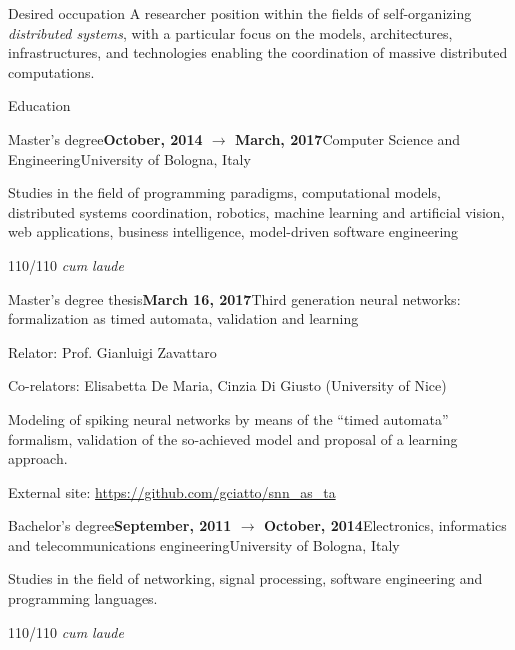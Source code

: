 \documentclass{resume} %
\begin{document}
\begin{rSection}{Desired occupation}
A researcher position within the fields of self-organizing \emph{distributed systems}, with a particular focus on the models, architectures, infrastructures, and technologies enabling the coordination of massive distributed computations.
\end{rSection}


\begin{rSection}{Education}
\begin{rSubsection}{Master's degree}{\textbf{October, 2014 $\rightarrow$ March, 2017}}{Computer Science and Engineering}{University of Bologna, Italy}
\item Studies in the field of programming paradigms, computational models, distributed systems coordination, robotics, machine learning and artificial vision, web applications, business intelligence, model-driven software engineering

\item 110/110 \emph{cum laude}
\end{rSubsection}
\begin{rSubsection}{Master's degree thesis}{\textbf{March 16, 2017}}{Third generation neural networks: formalization as timed automata, validation and learning}{\begin{flushright}
			Relator: Prof. Gianluigi Zavattaro
		\end{flushright}}
	\item Co-relators: Elisabetta De Maria, Cinzia Di Giusto (University of Nice)
	\item Modeling of spiking neural networks by means of the ``timed automata'' formalism, validation of the so-achieved model and proposal of a learning approach.
	
	\item External site: \url{https://github.com/gciatto/snn_as_ta}
\end{rSubsection}
\begin{rSubsection}{Bachelor's degree}{\textbf{September, 2011 $\rightarrow$ October, 2014}}{Electronics, informatics and telecommunications engineering}{University of Bologna, Italy}
	\item Studies in the field of networking, signal processing, software engineering and programming languages.
	\item 110/110 \emph{cum laude}
\end{rSubsection}


\end{rSection}
\end{document}
